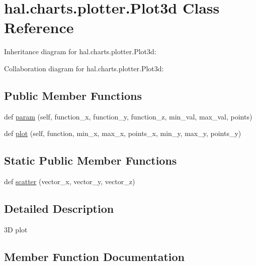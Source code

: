\hypertarget{classhal_1_1charts_1_1plotter_1_1_plot3d}{}\section{hal.\+charts.\+plotter.\+Plot3d Class Reference}
\label{classhal_1_1charts_1_1plotter_1_1_plot3d}


Inheritance diagram for hal.\+charts.\+plotter.\+Plot3d\+:


Collaboration diagram for hal.\+charts.\+plotter.\+Plot3d\+:
\subsection*{Public Member Functions}
\begin{DoxyCompactItemize}
\item 
def \hyperlink{classhal_1_1charts_1_1plotter_1_1_plot3d_a7491aead4c24acb26584a628be6cc963}{param} (self, function\+\_\+x, function\+\_\+y, function\+\_\+z, min\+\_\+val, max\+\_\+val, points)
\item 
def \hyperlink{classhal_1_1charts_1_1plotter_1_1_plot3d_a172fa864454c03cf797561b005dcdace}{plot} (self, function, min\+\_\+x, max\+\_\+x, points\+\_\+x, min\+\_\+y, max\+\_\+y, points\+\_\+y)
\end{DoxyCompactItemize}
\subsection*{Static Public Member Functions}
\begin{DoxyCompactItemize}
\item 
def \hyperlink{classhal_1_1charts_1_1plotter_1_1_plot3d_a1f446f8ff8f577def935bb452bd42619}{scatter} (vector\+\_\+x, vector\+\_\+y, vector\+\_\+z)
\end{DoxyCompactItemize}


\subsection{Detailed Description}
\begin{DoxyVerb}3D plot \end{DoxyVerb}
 

\subsection{Member Function Documentation}
